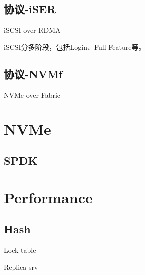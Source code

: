 \subsection{协议-iSER}

iSCSI over RDMA

iSCSI分多阶段，包括Login、Full Feature等。

\subsection{协议-NVMf}

NVMe over Fabric

\section{NVMe}

\subsection{SPDK}

\section{Performance}

\subsection{Hash}

\begin{enumbox}
\item Lock table
\item Replica srv
\end{enumbox}

